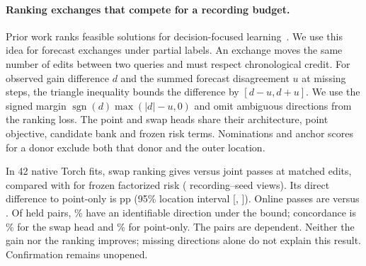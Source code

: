 \paragraph{Ranking exchanges that compete for a recording budget.}
Prior work ranks feasible solutions for decision-focused
learning~\cite{mandi2022rank}. We use this idea for forecast exchanges
under partial labels. An exchange moves the same number of edits between
two queries and must respect chronological credit. For observed gain
difference $d$ and the summed forecast disagreement $u$ at missing steps,
the triangle inequality bounds the difference by $[d-u,d+u]$. We use the
signed margin $\operatorname{sgn}(d)\max(|d|-u,0)$ and omit ambiguous
directions from the ranking loss. The point and swap heads share their
architecture, point objective, candidate bank and frozen risk terms.
Nominations and anchor scores for a donor exclude both that donor and
the outer location.

In 42 native Torch fits, swap ranking gives \CrossSwapMatchedRank{}
versus \CrossSwapMatchedPoint{} joint passes at \CrossSwapEdits{} matched
edits, compared with \CrossSwapMatchedFactor{} for frozen factorized
risk (\CrossSwapViews{} recording--seed views). Its direct difference
to point-only is \CrossSwapDiff{} pp (95\% location interval
[\CrossSwapLow{}, \CrossSwapHigh{}]). Online passes are \CrossSwapOnlineRank{}
versus \CrossSwapOnlinePoint{}. Of \CrossSwapPairN{} held pairs,
\CrossSwapCert{}\% have an identifiable direction under the bound;
concordance is \CrossSwapAccRank{}\% for the swap head and
\CrossSwapAccPoint{}\% for point-only. The pairs are dependent. Neither
the gain nor the ranking improves; missing directions alone do not
explain this result. Confirmation remains unopened.
